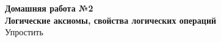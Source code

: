 



    \begin{center}
        \textbf{Домашняя работа №2 \\Логические аксиомы, свойства логических операций}\\
        Упростить
    \end{center}

    \begin{enumerate}
    \end{enumerate}


